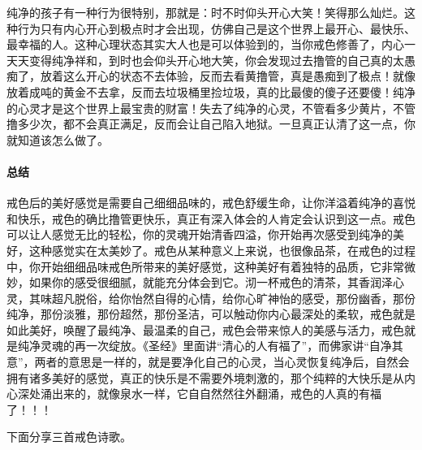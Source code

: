 纯净的孩子有一种行为很特别，那就是：时不时仰头开心大笑！笑得那么灿烂。这种行为只有内心开心到极点时才会出现，仿佛自己是这个世界上最开心、最快乐、最幸福的人。这种心理状态其实大人也是可以体验到的，当你戒色修善了，内心一天天变得纯净祥和，到时也会仰头开心地大笑，你会发现过去撸管的自己真的太愚痴了，放着这么开心的状态不去体验，反而去看黄撸管，真是愚痴到了极点！就像放着成吨的黄金不去拿，反而去垃圾桶里捡垃圾，真的比最傻的傻子还要傻！纯净的心灵才是这个世界上最宝贵的财富！失去了纯净的心灵，不管看多少黄片，不管撸多少次，都不会真正满足，反而会让自己陷入地狱。一旦真正认清了这一点，你就知道该怎么做了。

\paragraph*{总结}

戒色后的美好感觉是需要自己细细品味的，戒色舒缓生命，让你洋溢着纯净的喜悦和快乐，戒色的确比撸管更快乐，真正有深入体会的人肯定会认识到这一点。戒色可以让人感觉无比的轻松，你的灵魂开始清香四溢，你开始再次感受到纯净的美好，这种感觉实在太美妙了。戒色从某种意义上来说，也很像品茶，在戒色的过程中，你开始细细品味戒色所带来的美好感觉，这种美好有着独特的品质，它非常微妙，如果你的感受很细腻，就能充分体会到它。沏一杯戒色的清茶，其香润泽心灵，其味超凡脱俗，给你怡然自得的心情，给你心旷神怡的感受，那份幽香，那份纯净，那份淡雅，那份超然，那份圣洁，可以触动你内心最深处的柔软，戒色就是如此美好，唤醒了最纯净、最温柔的自己，戒色会带来惊人的美感与活力，戒色就是纯净灵魂的再一次绽放。《圣经》里面讲“清心的人有福了”，而佛家讲“自净其意”，两者的意思是一样的，就是要净化自己的心灵，当心灵恢复纯净后，自然会拥有诸多美好的感觉，真正的快乐是不需要外境刺激的，那个纯粹的大快乐是从内心深处涌出来的，就像泉水一样，它自自然然往外翻涌，戒色的人真的有福了！！！

下面分享三首戒色诗歌。

